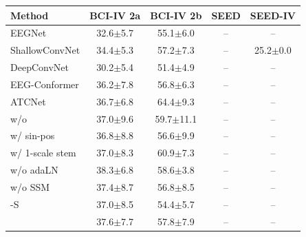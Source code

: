 \begin{tabular}{lcccc}
\toprule
Method & BCI-IV 2a & BCI-IV 2b & SEED & SEED-IV \\
\midrule
EEGNet & 32.6$\pm$5.7 & 55.1$\pm$6.0 & -- & -- \\
ShallowConvNet & 34.4$\pm$5.3 & 57.2$\pm$7.3 & -- & 25.2$\pm$0.0 \\
DeepConvNet & 30.2$\pm$5.4 & 51.4$\pm$4.9 & -- & -- \\
EEG-Conformer & 36.2$\pm$7.8 & 56.8$\pm$6.3 & -- & -- \\
ATCNet & 36.7$\pm$6.8 & 64.4$\pm$9.3 & -- & -- \\
\method{} w/o \scn{} & 37.0$\pm$9.6 & 59.7$\pm$11.1 & -- & -- \\
\method{} w/ sin-pos & 36.8$\pm$8.8 & 56.6$\pm$9.9 & -- & -- \\
\method{} w/ 1-scale stem & 37.0$\pm$8.3 & 60.9$\pm$7.3 & -- & -- \\
\method{} w/o adaLN & 38.3$\pm$6.8 & 58.6$\pm$3.8 & -- & -- \\
\method{} w/o SSM & 37.4$\pm$8.7 & 56.8$\pm$8.5 & -- & -- \\
\method{}-S & 37.0$\pm$8.5 & 54.4$\pm$5.7 & -- & -- \\
\method{} & 37.6$\pm$7.7 & 57.8$\pm$7.9 & -- & -- \\
\bottomrule
\end{tabular}
